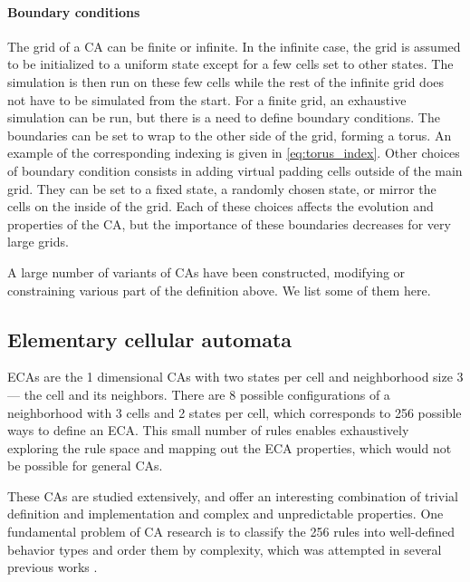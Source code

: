 \paragraph{Boundary conditions}
The grid of a \ac{CA} can be finite or infinite. In the infinite case, the grid
is assumed to be initialized to a uniform state except for a few cells set to
other states. The simulation is then run on these few cells while the rest of
the infinite grid does not have to be simulated from the start. For a finite
grid, an exhaustive simulation can be run, but there is a need to define
boundary conditions. The boundaries can be set to wrap to the other side of the
grid, forming a torus. An example of the corresponding indexing is given in
\eqref{eq:torus_index}. Other choices of boundary condition consists in adding
virtual padding cells outside of the main grid. They can be set to a fixed
state, a randomly chosen state, or mirror the cells on the inside of the grid.
Each of these choices affects the evolution and properties of the \ac{CA}, but
the importance of these boundaries decreases for very large grids.

A large number of variants of \acp{CA} have been constructed, modifying or
constraining various part of the definition above. We list some of them here.

\subsection{Elementary cellular automata \label{sec:elem-cell-autom}}
\Acp{ECA} are the 1 dimensional \acp{CA} with two states per cell and
neighborhood size 3 --- the cell and its neighbors. There are 8 possible
configurations of a neighborhood with 3 cells and 2 states per cell, which
corresponds to 256 possible ways to define an \ac{ECA}. This small number of
rules enables exhaustively exploring the rule space and mapping out the \ac{ECA}
properties, which would not be possible for general \acp{CA}.

These \acp{CA} are studied extensively, and offer an interesting combination of
trivial definition and implementation and complex and unpredictable properties.
One fundamental problem of \ac{CA} research is to classify the 256 rules into
well-defined behavior types and order them by complexity, which was attempted in
several previous works
\parencite{wolframNewKindScience2002,
  zenilCompressionBasedInvestigationDynamical2010,
  hudcovaClassificationComplexSystems2020,
  hudcovaComputationalHierarchyElementary2021}.

